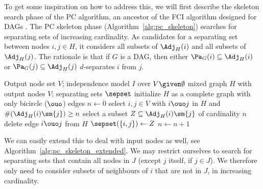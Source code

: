 To get some inspiration on how to address this, we will first describe the skeleton search phase of the PC algorithm, an ancestor of the FCI algorithm designed for DAGs \cite{SGS2000}.
The PC skeleton phase (Algorithm~\ref{alg:pc_skeleton}) searches for separating sets of increasing cardinality. 
As candidates for a separating set between nodes $i,j \in H$, it considers all subsets of $\Adj_H(i)$ and all subsets of $\Adj_H(j)$.
The rationale is that if $G$ is a DAG, then either $\Pa_G(i) \subseteq \Adj_H(i)$ or $\Pa_G(j) \subseteq \Adj_H(j)$ $d$-separates $i$ from $j$.

\begin{algorithm}
  \begin{algorithmic}[1]
  \Input Output node set $V$; independence model $I$ over $V \given \emptyset$
  \Output mixed graph $H$ with output nodes $V$; separating sets $\sepset$
  \State initialize $H$ as a complete graph with only bicircle ($\ouo$) edges
  \State $n \leftarrow 0$
    \Repeat
    \Repeat
    \State select $i,j \in V$ with $i \ouo j$ in $H$ and $\#(\Adj_H(i)\sm\{j\}) \ge n$
    \State select a subset $Z \subseteq \Adj_H(i)\sm\{j\}$ of cardinality $n$
      \State delete edge $i \ouo j$ from $H$
      \State $\sepset(\{i,j\}) \leftarrow Z$
    \EndIf
    \State $n \leftarrow n + 1$
  \end{algorithmic}
  \caption{Original PC skeleton algorithm.\label{alg:pc_skeleton}}
\end{algorithm}

We can easily extend this to deal with input nodes as well, see Algorithm~\ref{alg:pc_skeleton_extended}.
We may restrict ourselves to search for separating sets that contain all nodes in $J$ (except $j$ itself, if $j \in J$).
We therefore only need to consider subsets of neighbours of $i$ that are not in $J$, in increasing cardinality.

